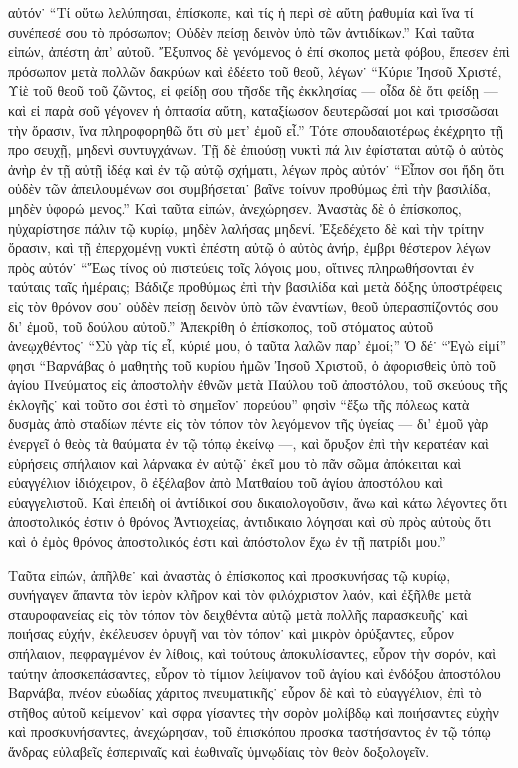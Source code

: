 αὐτόν˙ \enquote{Τί οὕτω λελύπησαι, ἐπίσκοπε, καὶ τίς ἡ περὶ
σὲ αὕτη ῥαθυμία καὶ ἵνα τί συνέπεσέ σου τὸ πρόσωπον;
Οὐδὲν πείσῃ δεινὸν ὑπὸ τῶν ἀντιδίκων.} Καὶ ταῦτα
εἰπών, ἀπέστη ἀπ’ αὐτοῦ. Ἔξυπνος δὲ γενόμενος ὁ ἐπί%
σκοπος μετὰ φόβου, ἔπεσεν ἐπὶ πρόσωπον μετὰ πολλῶν
δακρύων καὶ ἐδέετο τοῦ θεοῦ, λέγων˙ \enquote{Κύριε Ἰησοῦ
Χριστέ, Υἱὲ τοῦ θεοῦ τοῦ ζῶντος, εἰ φείδῃ σου τῆσδε
τῆς ἐκκλησίας --- οἶδα δὲ ὅτι φείδῃ --- καὶ εἰ παρὰ σοῦ
γέγονεν ἡ ὀπτασία αὕτη, καταξίωσον δευτερῶσαί μοι
καὶ τρισσῶσαι τὴν ὅρασιν, ἵνα πληροφορηθῶ ὅτι σὺ
μετ’ ἐμοῦ εἶ.} Τότε σπουδαιοτέρως ἐκέχρητο τῇ προ%
σευχῇ, μηδενὶ συντυγχάνων. Τῇ δὲ ἐπιούσῃ νυκτὶ πά%
λιν ἐφίσταται αὐτῷ ὁ αὐτὸς ἀνὴρ ἐν τῇ αὐτῇ ἰδέᾳ
καὶ ἐν τῷ αὐτῷ σχήματι, λέγων πρὸς αὐτόν˙ \enquote{Εἶπον
σοι ἤδη ὅτι οὐδὲν τῶν ἀπειλουμένων σοι συμβήσεται˙
βαῖνε τοίνυν προθύμως ἐπὶ τὴν βασιλίδα, μηδὲν ὑφορώ%
μενος.} Καὶ ταῦτα εἰπών, ἀνεχώρησεν. Ἀναστὰς δὲ ὁ
ἐπίσκοπος, ηὐχαρίστησε πάλιν τῷ κυρίῳ, μηδὲν λαλήσας
μηδενί. Ἐξεδέχετο δὲ καὶ τὴν τρίτην ὅρασιν, καὶ τῇ
ἐπερχομένῃ νυκτὶ ἐπέστη αὐτῷ ὁ αὐτὸς ἀνήρ, ἐμβρι%
θέστερον λέγων πρὸς αὐτόν˙ \enquote{Ἕως τίνος οὐ πιστεύεις
τοῖς λόγοις μου, οἵτινες πληρωθήσονται ἐν ταύταις ταῖς
ἡμέραις; Βάδιζε προθύμως ἐπὶ τὴν βασιλίδα καὶ μετὰ
δόξης ὑποστρέφεις εἰς τὸν θρόνον σου˙ οὐδὲν πείσῃ
δεινὸν ὑπὸ τῶν ἐναντίων, θεοῦ ὑπερασπίζοντός σου
δι’ ἐμοῦ, τοῦ δούλου αὐτοῦ.} Ἀπεκρίθη ὁ ἐπίσκοπος, τοῦ
στόματος αὐτοῦ ἀνεῳχθέντος˙ \enquote{Σὺ γὰρ τίς εἶ, κύριέ μου,
ὁ ταῦτα λαλῶν παρ’ ἐμοί;} Ὁ δέ˙ \enquote{Ἐγὼ εἰμί} φησι
\enquote{Βαρνάβας ὁ μαθητὴς τοῦ κυρίου ἡμῶν Ἰησοῦ Χριστοῦ,
ὁ ἀφορισθεὶς ὑπὸ τοῦ ἁγίου Πνεύματος εἰς ἀποστολὴν
ἐθνῶν μετὰ Παύλου τοῦ ἀποστόλου, τοῦ σκεύους τῆς
ἐκλογῆς˙ καὶ τοῦτο σοι ἐστὶ τὸ σημεῖον˙ πορεύου} φησὶν
\enquote{ἔξω τῆς πόλεως κατὰ δυσμὰς ἀπὸ σταδίων πέντε εἰς
τὸν τόπον τὸν λεγόμενον τῆς ὑγείας --- δι’ ἐμοῦ γὰρ
ἐνεργεῖ ὁ θεὸς τὰ θαύματα ἐν τῷ τόπῳ ἐκείνῳ ---, καὶ
ὄρυξον ἐπὶ τὴν κερατέαν καὶ εὑρήσεις σπήλαιον καὶ
λάρνακα ἐν αὐτῷ˙ ἐκεῖ μου τὸ πᾶν σῶμα ἀπόκειται
καὶ εὐαγγέλιον ἰδιόχειρον, ὃ ἐξέλαβον ἀπὸ Ματθαίου
τοῦ ἁγίου ἀποστόλου καὶ εὐαγγελιστοῦ. Καὶ ἐπειδὴ οἱ
ἀντίδικοί σου δικαιολογοῦσιν, ἄνω καὶ κάτω λέγοντες
ὅτι ἀποστολικός ἐστιν ὁ θρόνος Ἀντιοχείας, ἀντιδικαιο%
λόγησαι καὶ σὺ πρὸς αὐτοὺς ὅτι καὶ ὁ ἐμὸς θρόνος
ἀποστολικός ἐστι καὶ ἀπόστολον ἔχω ἐν τῇ πατρίδι
μου.}

Ταῦτα εἰπών, ἀπῆλθε˙ καὶ ἀναστὰς ὁ ἐπίσκοπος καὶ
προσκυνήσας τῷ κυρίῳ, συνήγαγεν ἅπαντα τὸν ἱερὸν
κλῆρον καὶ τὸν φιλόχριστον λαόν, καὶ ἐξῆλθε μετὰ
σταυροφανείας εἰς τὸν τόπον τὸν δειχθέντα αὐτῷ μετὰ
πολλῆς παρασκευῆς˙ καὶ ποιήσας εὐχήν, ἐκέλευσεν ὀρυγῆ%
ναι τὸν τόπον˙ καὶ μικρὸν ὀρύξαντες, εὗρον σπήλαιον,
πεφραγμένον ἐν λίθοις, καὶ τούτους ἀποκυλίσαντες, εὗρον
τὴν σορόν, καὶ ταύτην ἀποσκεπάσαντες, εὗρον τὸ τίμιον
λείψανον τοῦ ἁγίου καὶ ἐνδόξου ἀποστόλου Βαρνάβα,
πνέον εὐωδίας χάριτος πνευματικῆς˙ εὗρον δὲ καὶ τὸ
εὐαγγέλιον, ἐπὶ τὸ στῆθος αὐτοῦ κείμενον˙ καὶ σφρα%
γίσαντες τὴν σορὸν μολίβδῳ καὶ ποιήσαντες εὐχὴν καὶ
προσκυνήσαντες, ἀνεχώρησαν, τοῦ ἐπισκόπου προσκα%
ταστήσαντος ἐν τῷ τόπῳ ἄνδρας εὐλαβεῖς ἑσπεριναῖς
καὶ ἑωθιναῖς ὑμνῳδίαις τὸν θεὸν δοξολογεῖν.


